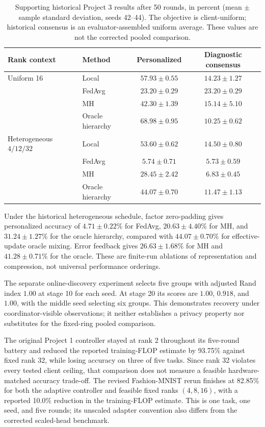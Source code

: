 \documentclass[11pt]{article}
\begin{document}
\begin{table}[t]
\centering
\caption{Supporting historical Project 3 results after 50 rounds, in percent (mean $\pm$ sample standard deviation, seeds 42--44). The objective is client-uniform; historical consensus is an evaluator-assembled uniform average. These values are not the corrected pooled comparison.}
\label{tab:historical-protocols}
\small
\begin{tabular}{llcc}
\toprule
Rank context & Method & Personalized & Diagnostic consensus\\
\midrule
Uniform 16 & Local & $57.93\pm0.55$ & $14.23\pm1.27$\\
& FedAvg & $23.20\pm0.29$ & $23.20\pm0.29$\\
& MH & $42.30\pm1.39$ & $15.14\pm5.10$\\
& Oracle hierarchy & $68.98\pm0.95$ & $10.25\pm0.62$\\
\midrule
Heterogeneous $4/12/32$ & Local & $53.60\pm0.62$ & $14.50\pm0.80$\\
& FedAvg & $5.74\pm0.71$ & $5.73\pm0.59$\\
& MH & $28.45\pm2.42$ & $6.83\pm0.45$\\
& Oracle hierarchy & $44.07\pm0.70$ & $11.47\pm1.13$\\
\bottomrule
\end{tabular}
\end{table}

Under the historical heterogeneous schedule, factor zero-padding gives personalized accuracy of $4.71\pm0.22\%$ for FedAvg, $20.63\pm4.40\%$ for MH, and $31.24\pm1.27\%$ for the oracle hierarchy, compared with $44.07\pm0.70\%$ for effective-update oracle mixing. Error feedback gives $26.63\pm1.68\%$ for MH and $41.28\pm0.71\%$ for the oracle. These are finite-run ablations of representation and compression, not universal performance orderings.

The separate online-discovery experiment selects five groups with adjusted Rand index $1.00$ at stage 10 for each seed. At stage 20 its scores are $1.00$, $0.918$, and $1.00$, with the middle seed selecting six groups. This demonstrates recovery under coordinator-visible observations; it neither establishes a privacy property nor substitutes for the fixed-ring pooled comparison.

The original Project 1 controller stayed at rank 2 throughout its five-round battery and reduced the reported training-FLOP estimate by 93.75\% against fixed rank 32, while losing accuracy on three of five tasks. Since rank 32 violates every tested client ceiling, that comparison does not measure a feasible hardware-matched accuracy trade-off. The revised Fashion-MNIST rerun finishes at 82.85\% for both the adaptive controller and feasible fixed ranks $(4,8,16)$, with a reported 10.0\% reduction in the training-FLOP estimate. This is one task, one seed, and five rounds; its unscaled adapter convention also differs from the corrected scaled-head benchmark.
\end{document}
